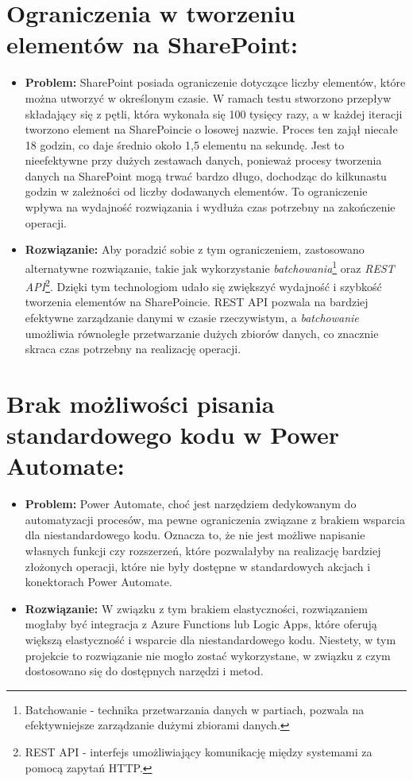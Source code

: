             \section*{Ograniczenia w tworzeniu elementów na SharePoint:}
            \begin{itemize}
                  \item \textbf{Problem:} SharePoint posiada ograniczenie dotyczące liczby elementów, które można utworzyć w określonym czasie. W ramach testu stworzono przepływ składający się z pętli, która wykonała się 100 tysięcy razy, a w każdej iteracji tworzono element na SharePoincie o losowej nazwie. Proces ten zajął niecałe 18 godzin, co daje średnio około 1,5 elementu na sekundę. Jest to nieefektywne przy dużych zestawach danych, ponieważ procesy tworzenia danych na SharePoint mogą trwać bardzo długo, dochodząc do kilkunastu godzin w zależności od liczby dodawanych elementów. To ograniczenie wpływa na wydajność rozwiązania i wydłuża czas potrzebny na zakończenie operacji.
                  \item \textbf{Rozwiązanie:} Aby poradzić sobie z tym ograniczeniem, zastosowano alternatywne rozwiązanie, takie jak wykorzystanie \emph{batchowania}\footnote{Batchowanie - technika przetwarzania danych w partiach, pozwala na efektywniejsze zarządzanie dużymi zbiorami danych.} oraz \emph{REST API}\footnote{REST API - interfejs umożliwiający komunikację między systemami za pomocą zapytań HTTP.}. Dzięki tym technologiom udało się zwiększyć wydajność i szybkość tworzenia elementów na SharePoincie. REST API pozwala na bardziej efektywne zarządzanie danymi w czasie rzeczywistym, a \emph{batchowanie} umożliwia równoległe przetwarzanie dużych zbiorów danych, co znacznie skraca czas potrzebny na realizację operacji.
            \end{itemize}

            \section*{Brak możliwości pisania standardowego kodu w Power Automate:}
            \begin{itemize}
                  \item \textbf{Problem:} Power Automate, choć jest narzędziem dedykowanym do automatyzacji procesów, ma pewne ograniczenia związane z brakiem wsparcia dla niestandardowego kodu. Oznacza to, że nie jest możliwe napisanie własnych funkcji czy rozszerzeń, które pozwalałyby na realizację bardziej złożonych operacji, które nie były dostępne w standardowych akcjach i konektorach Power Automate.
                  \item \textbf{Rozwiązanie:} W związku z tym brakiem elastyczności, rozwiązaniem mogłaby być integracja z Azure Functions lub Logic Apps, które oferują większą elastyczność i wsparcie dla niestandardowego kodu. Niestety, w tym projekcie to rozwiązanie nie mogło zostać wykorzystane, w związku z czym dostosowano się do dostępnych narzędzi i metod.
            \end{itemize}

